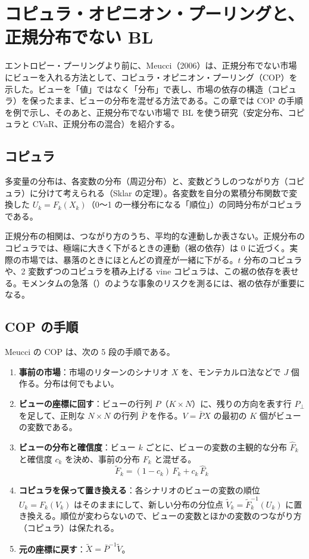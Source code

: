 \chapter{コピュラ・オピニオン・プーリングと、正規分布でない BL}\label{ch:cop}

エントロピー・プーリングより前に、Meucci（2006）は、正規分布でない市場にビューを入れる方法として、コピュラ・オピニオン・プーリング（COP）を示した。ビューを「値」ではなく「分布」で表し、市場の依存の構造（コピュラ）を保ったまま、ビューの分布を混ぜる方法である。この章では COP の手順を例で示し、そのあと、正規分布でない市場で BL を使う研究（安定分布、コピュラと CVaR、正規分布の混合）を紹介する。

\section{コピュラ}

多変量の分布は、各変数の分布（周辺分布）と、変数どうしのつながり方（コピュラ）に分けて考えられる（Sklar の定理）。各変数を自分の累積分布関数で変換した $U_k=F_k(X_k)$（0〜1 の一様分布になる「順位」）の同時分布がコピュラである。

正規分布の相関は、つながり方のうち、平均的な連動しか表さない。正規分布のコピュラでは、極端に大きく下がるときの連動（裾の依存）は 0 に近づく。実際の市場では、暴落のときにほとんどの資産が一緒に下がる。$t$ 分布のコピュラや、2 変数ずつのコピュラを積み上げる vine コピュラは、この裾の依存を表せる。モメンタムの急落（）のような事象のリスクを測るには、裾の依存が重要になる。

\section{COP の手順}

Meucci の COP は、次の 5 段の手順である。

\begin{enumerate}
\item \textbf{事前の市場}：市場のリターンのシナリオ $X$ を、モンテカルロ法などで $J$ 個作る。分布は何でもよい。
\item \textbf{ビューの座標に回す}：ビューの行列 $P$（$K\times N$）に、残りの方向を表す行 $P_\perp$ を足して、正則な $N\times N$ の行列 $\bar P$ を作る。$V=\bar PX$ の最初の $K$ 個がビューの変数である。
\item \textbf{ビューの分布と確信度}：ビュー $k$ ごとに、ビューの変数の主観的な分布 $\hat F_k$ と確信度 $c_k$ を決め、事前の分布 $F_k$ と混ぜる。
\begin{equation}
\tilde F_k=(1-c_k)\,F_k+c_k\,\hat F_k
\end{equation}
\item \textbf{コピュラを保って置き換える}：各シナリオのビューの変数の順位 $U_k=F_k(V_k)$ はそのままにして、新しい分布の分位点 $\tilde V_k=\tilde F_k^{-1}(U_k)$ に置き換える。順位が変わらないので、ビューの変数とほかの変数のつながり方（コピュラ）は保たれる。
\item \textbf{元の座標に戻す}：$\tilde X=\bar P^{-1}\tilde V$。
\end{enumerate}


